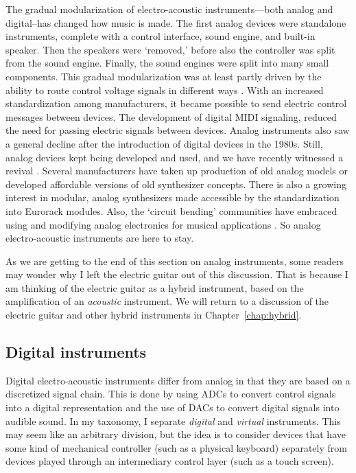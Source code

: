 The gradual modularization of electro-acoustic instruments---both analog and digital--has changed how music is made. The first analog devices were standalone instruments, complete with a control interface, sound engine, and built-in speaker. Then the speakers were `removed,' before also the controller was split from the sound engine. Finally, the sound engines were split into many small components.
This gradual modularization was at least partly driven by the ability to route control voltage signals in different ways \citep{bjorn_patch_2018}.
With an increased standardization among manufacturers, it became possible to send electric control messages between devices. The development of digital MIDI signaling, reduced the need for passing electric signals between devices. Analog instruments also saw a general decline after the introduction of digital devices in the 1980s. Still, analog devices kept being developed and used, and we have recently witnessed a revival \citep{barlindhaug_kids_2019}. Several manufacturers have taken up production of old analog models or developed affordable versions of old synthesizer concepts. There is also a growing interest in modular, analog synthesizers made accessible by the standardization into Eurorack modules. Also, the `circuit bending' communities have embraced using and modifying analog electronics for musical applications \citep{skjulstad_circuit_2016}. So analog electro-acoustic instruments are here to stay.

As we are getting to the end of this section on analog instruments, some readers may wonder why I left the electric guitar out of this discussion. That is because I am thinking of the electric guitar as a hybrid instrument, based on the amplification of an \emph{acoustic} instrument. We will return to a discussion of the electric guitar and other hybrid instruments in Chapter~\ref{chap:hybrid}.


\subsection{Digital instruments}

Digital electro-acoustic instruments differ from analog in that they are based on a discretized signal chain. This is done by using ADCs to convert control signals into a digital representation and the use of DACs to convert digital signals into audible sound. In my taxonomy, I separate \emph{digital} and \emph{virtual} instruments. This may seem like an arbitrary division, but the idea is to consider devices that have some kind of mechanical controller (such as a physical keyboard) separately from devices played through an intermediary control layer (such as a touch screen).

